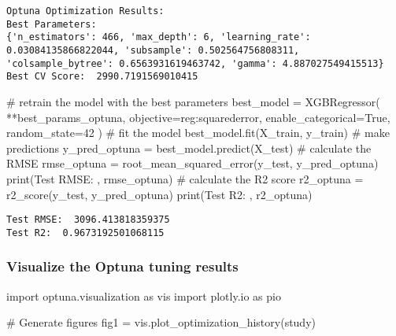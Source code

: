 \documentclass[
  letterpaper,
  DIV=11,
  numbers=noendperiod]{scrreprt}
\newenvironment{Shaded}{\begin{snugshade}}{\end{snugshade}}
\newcommand{\BuiltInTok}[1]{\textcolor[rgb]{0.00,0.23,0.31}{#1}}
\newcommand{\CommentTok}[1]{\textcolor[rgb]{0.37,0.37,0.37}{#1}}
\newcommand{\DecValTok}[1]{\textcolor[rgb]{0.68,0.00,0.00}{#1}}
\newcommand{\ImportTok}[1]{\textcolor[rgb]{0.00,0.46,0.62}{#1}}
\newcommand{\NormalTok}[1]{\textcolor[rgb]{0.00,0.23,0.31}{#1}}
\newcommand{\OperatorTok}[1]{\textcolor[rgb]{0.37,0.37,0.37}{#1}}
\newcommand{\StringTok}[1]{\textcolor[rgb]{0.13,0.47,0.30}{#1}}
\newcommand{\VariableTok}[1]{\textcolor[rgb]{0.07,0.07,0.07}{#1}}
\begin{document}
\begin{verbatim}
Optuna Optimization Results: 
Best Parameters: 
{'n_estimators': 466, 'max_depth': 6, 'learning_rate': 0.03084135866822044, 'subsample': 0.502564756808311, 'colsample_bytree': 0.6563931619463742, 'gamma': 4.887027549415513}
Best CV Score:  2990.7191569010415
\end{verbatim}

\begin{Shaded}
\begin{Highlighting}[]
\CommentTok{\# retrain the model with the best parameters}
\NormalTok{best\_model }\OperatorTok{=}\NormalTok{ XGBRegressor(}
    \OperatorTok{**}\NormalTok{best\_params\_optuna,}
\NormalTok{    objective}\OperatorTok{=}\StringTok{\textquotesingle{}reg:squarederror\textquotesingle{}}\NormalTok{,}
\NormalTok{    enable\_categorical}\OperatorTok{=}\VariableTok{True}\NormalTok{,}
\NormalTok{    random\_state}\OperatorTok{=}\DecValTok{42}
\NormalTok{)}
\CommentTok{\# fit the model}
\NormalTok{best\_model.fit(X\_train, y\_train)}
\CommentTok{\# make predictions}
\NormalTok{y\_pred\_optuna }\OperatorTok{=}\NormalTok{ best\_model.predict(X\_test)}
\CommentTok{\# calculate the RMSE}
\NormalTok{rmse\_optuna }\OperatorTok{=}\NormalTok{ root\_mean\_squared\_error(y\_test, y\_pred\_optuna)}
\BuiltInTok{print}\NormalTok{(}\StringTok{\textquotesingle{}Test RMSE: \textquotesingle{}}\NormalTok{, rmse\_optuna)}
\CommentTok{\# calculate the R2 score}
\NormalTok{r2\_optuna }\OperatorTok{=}\NormalTok{ r2\_score(y\_test, y\_pred\_optuna)}
\BuiltInTok{print}\NormalTok{(}\StringTok{\textquotesingle{}Test R2: \textquotesingle{}}\NormalTok{, r2\_optuna)}
\end{Highlighting}
\end{Shaded}

\begin{verbatim}
Test RMSE:  3096.413818359375
Test R2:  0.9673192501068115
\end{verbatim}

\subsubsection{Visualize the Optuna tuning
results}\label{visualize-the-optuna-tuning-results}

\begin{Shaded}
\begin{Highlighting}[]
\ImportTok{import}\NormalTok{ optuna.visualization }\ImportTok{as}\NormalTok{ vis}
\ImportTok{import}\NormalTok{ plotly.io }\ImportTok{as}\NormalTok{ pio}

\CommentTok{\# Generate figures}
\NormalTok{fig1 }\OperatorTok{=}\NormalTok{ vis.plot\_optimization\_history(study)}
\end{Highlighting}
\end{Shaded}
\end{document}
